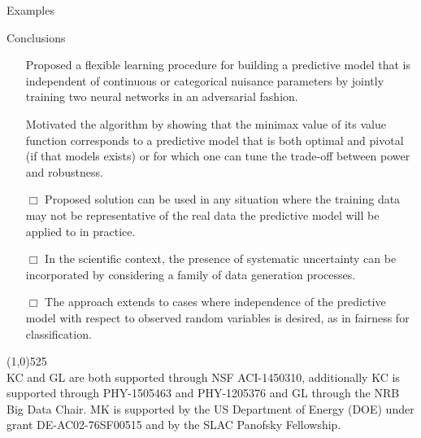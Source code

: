 \documentclass[final,unknownkeysallowed]{beamer}
\newcommand{\cmark}{\ding{51}}%
\begin{document}
\begin{frame}{}
\begin{textblock}{0.32}
\begin{block}{Examples \phantom{p}}
\end{block}

\vspace{0.5cm}
\begin{block}{Conclusions \phantom{p}}

\begin{itemize}
\item[{\color{green} \cmark}] Proposed a flexible learning procedure {\color{red}for building a
predictive model that is independent of continuous or categorical nuisance
parameters} by jointly training two neural networks in an adversarial fashion.

\item[{\color{green} \cmark}] Motivated the algorithm by showing
that the minimax value  of its value function corresponds to a predictive model
that is both optimal and pivotal (if that models exists) or for which one can
tune the trade-off between power and robustness.

\end{itemize}

\begin{itemize}
\item[{\color{blue} $\Box$}] Proposed solution can be used in any situation
where the training data may not be representative of the real data the
predictive model will be applied to in practice.

\item[{\color{blue} $\Box$}] In the scientific context, the
presence of systematic uncertainty can be incorporated by considering a family
of data generation processes.

\item[{\color{blue} $\Box$}] The approach extends to cases where independence of the predictive model with respect to
observed random variables is desired, {\color{red}as in fairness for
classification}.
\end{itemize}


\line(1,0){525}\\
KC and GL are both supported through NSF ACI-1450310, additionally KC is supported through PHY-1505463 and PHY-1205376 and GL through the NRB Big Data Chair. MK is supported by the US Department of Energy (DOE) under grant DE-AC02-76SF00515 and by the SLAC Panofsky Fellowship.
\end{block}




\end{textblock}




\end{frame}
\end{document}
